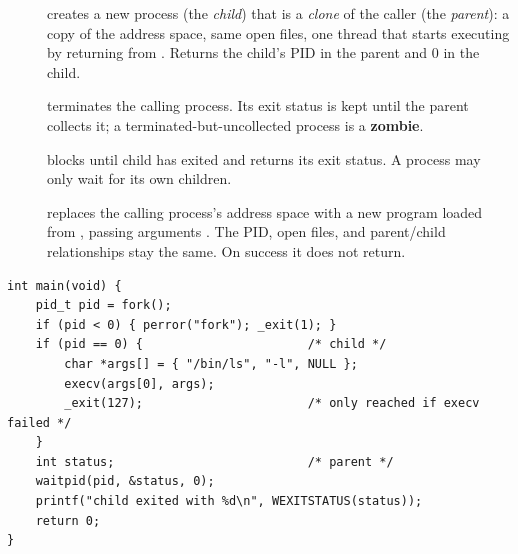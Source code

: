 \begin{description}
  \item[] creates a new process (the \emph{child}) that is a \emph{clone} of the
    caller (the \emph{parent}): a copy of the address space, same open files, one thread that
    starts executing by returning from . Returns the child's PID in the parent and
    0 in the child.
  \item[] terminates the calling process. Its exit status is kept until the
    parent collects it; a terminated-but-uncollected process is a \textbf{zombie}.
  \item[] blocks until child  has exited and
    returns its exit status. A process may only wait for its own children.
  \item[] replaces the calling process's address space with a new
    program loaded from , passing arguments . The PID, open files, and
    parent/child relationships stay the same. On success it does not return.
\end{description}

\begin{example}
\begin{lstlisting}[style=c]
int main(void) {
    pid_t pid = fork();
    if (pid < 0) { perror("fork"); _exit(1); }
    if (pid == 0) {                       /* child */
        char *args[] = { "/bin/ls", "-l", NULL };
        execv(args[0], args);
        _exit(127);                       /* only reached if execv failed */
    }
    int status;                           /* parent */
    waitpid(pid, &status, 0);
    printf("child exited with %d\n", WEXITSTATUS(status));
    return 0;
}
\end{lstlisting}
\end{example}

